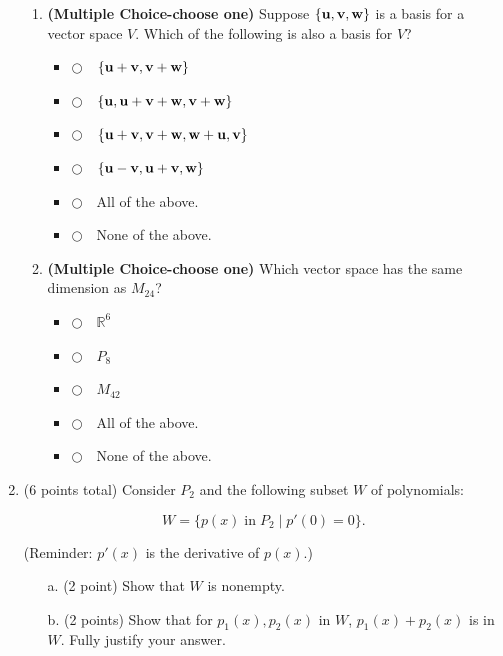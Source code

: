 \documentclass[12pt]{extarticle}
\newcommand{\chooseone}{{\Large$\Circle$\ \ }}
\begin{document}
\begin{enumerate}
\begin{enumerate}[label=\alph*.]
\item \textbf{(Multiple Choice-choose one)} Suppose $\{{\mathbf{u}},{\mathbf{v}},{\mathbf{w}}\}$ is a basis for a vector space $V$. Which of the following is also a basis for $V$?
\begin{itemize}[label={}]
\item \chooseone $\{{\mathbf{u}}+{\mathbf{v}},{\mathbf{v}}+{\mathbf{w}}\}$
\item \chooseone $\{{\mathbf{u}},{\mathbf{u}}+{\mathbf{v}}+{\mathbf{w}},{\mathbf{v}}+{\mathbf{w}}\}$
\item \chooseone $\{{\mathbf{u}}+{\mathbf{v}},{\mathbf{v}}+{\mathbf{w}},{\mathbf{w}}+{\mathbf{u}},{\mathbf{v}}\}$
\item \chooseone $\{{\mathbf{u}}-{\mathbf{v}},{\mathbf{u}}+{\mathbf{v}},{\mathbf{w}}\}$
\item \chooseone All of the above.
\item \chooseone None of the above.
\end{itemize}
\vspace{2cm}


\item \textbf{(Multiple Choice-choose one)} Which vector space has the same dimension as $M_{24}$?
\begin{itemize}[label={}]
\item \chooseone $\mathbb{R}^6$
\item \chooseone $P_8$
\item \chooseone $M_{42}$
\item \chooseone All of the above.
\item \chooseone None of the above.
\end{itemize}

\end{enumerate}




\newpage

\item (6 points total) Consider $P_2$ and the following subset $W$ of polynomials:

$$W=\{p(x) \; \text{in}\; P_2 \;|\; p'(0)=0\}.$$

(Reminder: $p'(x)$ is the derivative of $p(x)$.)

\begin{itemize}
    \item[a.] (2 point) Show that $W$ is nonempty.

    \vspace{1in}

    \item[b.] (2 points) Show that for $p_1(x), p_2(x)$ in $W$, $p_1(x)+p_2(x)$ is in $W$. Fully justify your answer.
\vfill


\end{itemize}
\end{enumerate}
\end{document}

